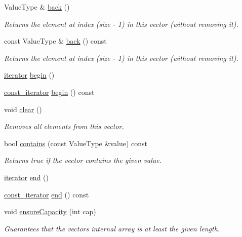 \begin{DoxyCompactItemize}
Value\+Type \& \mbox{\hyperlink{classVector_a2bad145b40a82c36986f67610313658d}{back}} ()
\begin{DoxyCompactList}\small\item\em Returns the element at index (size -\/ 1) in this vector (without removing it). \end{DoxyCompactList}\item 
const Value\+Type \& \mbox{\hyperlink{classVector_adc761c91bdacd01bed5c96e25fd9486a}{back}} () const
\begin{DoxyCompactList}\small\item\em Returns the element at index (size -\/ 1) in this vector (without removing it). \end{DoxyCompactList}\item 
\mbox{\hyperlink{classVector_aa8cbadd6807ea71ae7465ef4793a6866}{iterator}} \mbox{\hyperlink{classVector_aaba614c33559b8e311d00a84e2a68fb6}{begin}} ()
\item 
\mbox{\hyperlink{classVector_aa1fbc80673e1a5d9661a77e20836b8d8}{const\+\_\+iterator}} \mbox{\hyperlink{classVector_a906b1e081acafd8fd70dd152d41e7b88}{begin}} () const
\item 
void \mbox{\hyperlink{classVector_ac8bb3912a3ce86b15842e79d0b421204}{clear}} ()
\begin{DoxyCompactList}\small\item\em Removes all elements from this vector. \end{DoxyCompactList}\item 
bool \mbox{\hyperlink{classVector_a6fbc1a150987e7e5320d244a3baeb560}{contains}} (const Value\+Type \&value) const
\begin{DoxyCompactList}\small\item\em Returns true if the vector contains the given value. \end{DoxyCompactList}\item 
\mbox{\hyperlink{classVector_aa8cbadd6807ea71ae7465ef4793a6866}{iterator}} \mbox{\hyperlink{classVector_a2a45b7794f00a099c37860cf5df4477c}{end}} ()
\item 
\mbox{\hyperlink{classVector_aa1fbc80673e1a5d9661a77e20836b8d8}{const\+\_\+iterator}} \mbox{\hyperlink{classVector_aaf338fc55a6bef18f2e7279c537af2ff}{end}} () const
\item 
void \mbox{\hyperlink{classVector_a9552fd9e921fc047fdd59e59d82e88ef}{ensure\+Capacity}} (int cap)
\begin{DoxyCompactList}\small\item\em Guarantees that the vector\textquotesingle{}s internal array is at least the given length. \end{DoxyCompactList}\item 

\end{DoxyCompactItemize}
